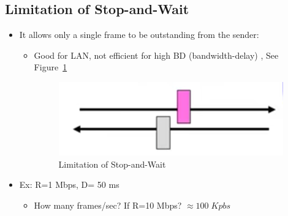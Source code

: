 \documentclass[12pt]{ctexart}   %
\begin{document}
	\subsection{Limitation of Stop-and-Wait}
	\begin{itemize}
		\item It allows only a single frame to be outstanding from the sender:
		\begin{itemize}
			\item Good for LAN, not efficient for high BD (bandwidth-delay) , See Figure~\ref{fig:3-2-8}
			
			\begin{figure}[h!] %
			\centering
			 \includegraphics[scale=0.7]{images/3-2-8}
			\caption{Limitation of Stop-and-Wait}
			 \label{fig:3-2-8}
			 \end{figure}
		 
		\end{itemize}
		
		\item Ex: R=1 Mbps, D= 50 ms
		\begin{itemize}
			\item How many frames/sec? If R=10 Mbps?  $\approx 100 \; Kpbs$
		\end{itemize}
	\end{itemize}
	
\end{document}
